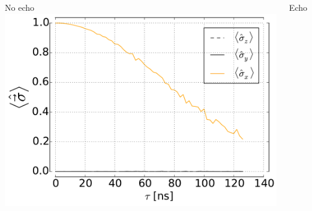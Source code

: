 \documentclass[aspectratio=169, 13pt]{beamer}
\begin{document}
\begin{frame}[c]
{\begin{columns}[c]
	No echo
	\centering
	\includegraphics[width=\textwidth]{deph_pink_se}
	
	Echo
	\end{columns}
}
\end{frame}
\end{document}

